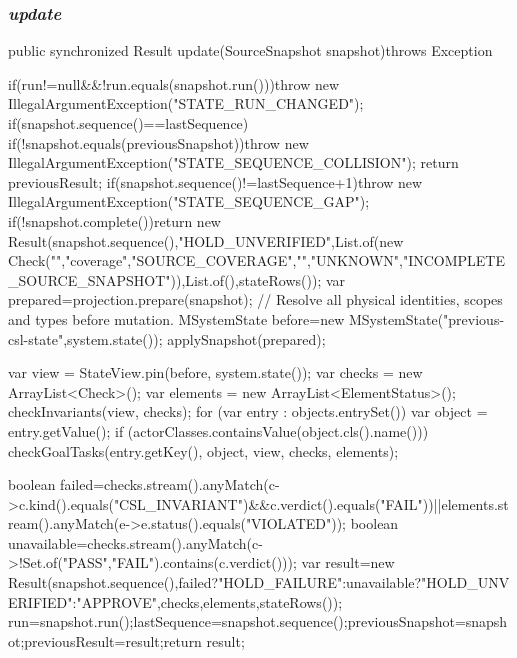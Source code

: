 \documentclass[12pt,a4paper,oneside]{extreport}
\begin{document}
\subsubsection*{\textit{update}}
\begin{thesiscode}[firstnumber=113]
public synchronized Result update(SourceSnapshot snapshot)throws Exception {
    if(run!=null&&!run.equals(snapshot.run()))throw new IllegalArgumentException("STATE_RUN_CHANGED");
    if(snapshot.sequence()==lastSequence) {
        if(!snapshot.equals(previousSnapshot))throw new IllegalArgumentException("STATE_SEQUENCE_COLLISION");
        return previousResult;
    }
    if(snapshot.sequence()!=lastSequence+1)throw new IllegalArgumentException("STATE_SEQUENCE_GAP");
    if(!snapshot.complete())return new Result(snapshot.sequence(),"HOLD_UNVERIFIED",List.of(new Check("","coverage","SOURCE_COVERAGE","","UNKNOWN","INCOMPLETE_SOURCE_SNAPSHOT")),List.of(),stateRows());
    var prepared=projection.prepare(snapshot); // Resolve all physical identities, scopes and types before mutation.
    MSystemState before=new MSystemState("previous-csl-state",system.state());
    applySnapshot(prepared);

    var view = StateView.pin(before, system.state());
    var checks = new ArrayList<Check>();
    var elements = new ArrayList<ElementStatus>();
    checkInvariants(view, checks);
    for (var entry : objects.entrySet()) {
        var object = entry.getValue();
        if (actorClasses.containsValue(object.cls().name())) {
            checkGoalTasks(entry.getKey(), object, view, checks, elements);
        }
    }

    boolean failed=checks.stream().anyMatch(c->c.kind().equals("CSL_INVARIANT")&&c.verdict().equals("FAIL"))||elements.stream().anyMatch(e->e.status().equals("VIOLATED"));
    boolean unavailable=checks.stream().anyMatch(c->!Set.of("PASS","FAIL").contains(c.verdict()));
    var result=new Result(snapshot.sequence(),failed?"HOLD_FAILURE":unavailable?"HOLD_UNVERIFIED":"APPROVE",checks,elements,stateRows());
    run=snapshot.run();lastSequence=snapshot.sequence();previousSnapshot=snapshot;previousResult=result;return result;
}
\end{thesiscode}
\end{document}
